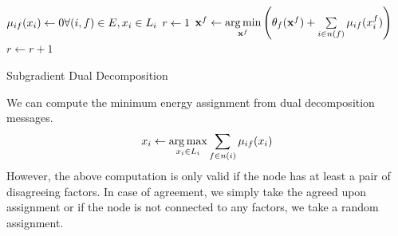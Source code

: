 \documentclass[letterpaper, 10 pt, conference]{ieeeconf} %
\DeclareMathOperator*{\argmin}{arg\,min}
\DeclareMathOperator*{\argmax}{arg\,max}
\newcommand{\vect}[1]{\mathbf{#1}}
\begin{document}
\begin{algorithm}
  \dontprintsemicolon

  $\msg{i}{f}{x_i} \assign 0 \hfill \forall (i, f) \in E, x_i \in \Sx$\;
  $r \leftarrow 1$\;
   {
     {%
      $\vect{x}^f \assign \argmin\limits_{\vect{x}^f} \left( \theta_f(\vect{x}^f) + \sum\limits_{i \in n(f)}\msg{i}{f}{x^f_i} \right)$\;
    }
     {
    }
    $r \leftarrow r + 1$\;
  }
  \label{alg:dualdecompostion}
  \caption{Subgradient Dual Decomposition}
\end{algorithm}
We can compute the minimum energy assignment from dual decomposition messages.
\begin{align}
  x_i \assign \argmax\limits_{x_i \in \Sx} \sum\limits_{f \in n(i)} \msg{i}{f}{x_i}
\end{align}
However, the above computation is only valid if the node has at least a pair of disagreeing factors. In case of agreement, we simply take the agreed upon assignment or if the node is not connected to any factors, we take a random assignment.
\end{document}
